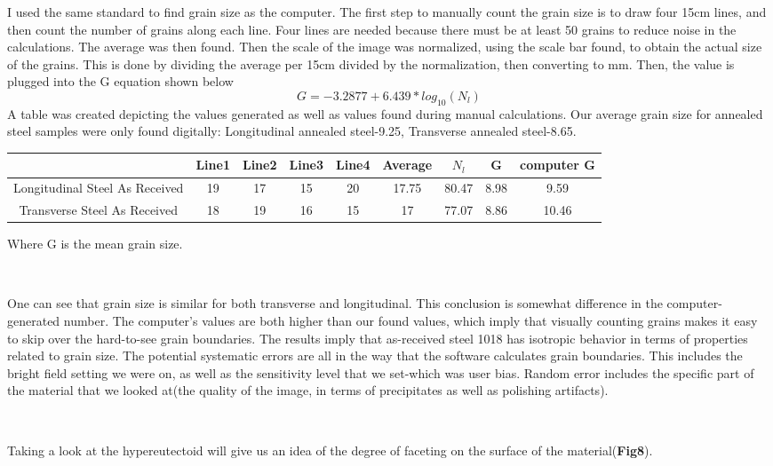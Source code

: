 \documentclass{article}
\begin{document}
I used the same standard to find grain size as the computer. The first step to manually count the grain size is to draw four 15cm lines, and then count the number of grains along each line. Four lines are needed because there must be at least 50 grains to reduce noise in the calculations. The average was then found. Then the scale of the image was normalized, using the scale bar found, to obtain the actual size of the grains. This is done by dividing the average per 15cm divided by the normalization, then converting to mm. Then, the value is plugged into the G equation shown below
$$G = -3.2877+6.439*log_{10}(N_l)$$
A table was created depicting the values generated as well as values found during manual calculations. Our average grain size for annealed steel samples were only found digitally: Longitudinal annealed steel-9.25, Transverse annealed steel-8.65.


\centering
\begin{tabular}{|| c | c | c | c | c | c | c | c | c ||}
 \hline
 \ & Line1 & Line2 & Line3 & Line4 & Average & $N_l$ & G & computer G\\
 \hline
 \hline
 Longitudinal Steel As Received & 19 & 17 & 15 & 20 & 17.75 & 80.47 & 8.98 & 9.59\\
 \hline
 Transverse Steel As Received & 18 & 19 & 16 & 15 & 17 & 77.07 & 8.86 & 10.46\\
 \hline
\end{tabular}
\raggedright

Where G is the mean grain size.

\ 

One can see that grain size is similar for both transverse and longitudinal. This conclusion is somewhat difference in the computer-generated number. The computer's values are both higher than our found values, which imply that visually counting grains makes it easy to skip over the hard-to-see grain boundaries. The results imply that as-received steel 1018 has isotropic behavior in terms of properties related to grain size. The potential systematic errors are all in the way that the software calculates grain boundaries. This includes the bright field setting we were on, as well as the sensitivity level that we set-which was user bias. Random error includes the specific part of the material that we looked at(the quality of the image, in terms of precipitates as well as polishing artifacts).

\ 

Taking a look at the hypereutectoid will give us an idea of the degree of faceting on the surface of the material(\textbf{Fig8}).
\end{document}

